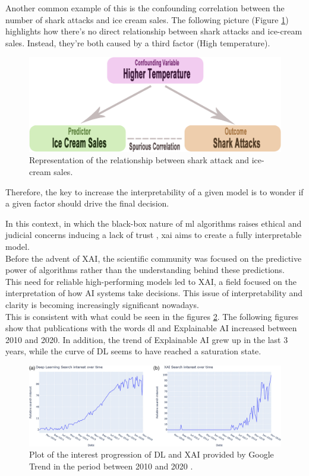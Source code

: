 Another common example of this is the confounding correlation between the number of shark attacks and ice cream sales. 
The following picture (Figure \ref{fig:shark}) \cite{shark-icecream} highlights how there's no direct relationship between shark attacks and ice-cream sales. Instead, they're both caused by a third factor (High temperature).\newline
\begin{figure}[H]
    \centering
    \includegraphics[scale=0.25]{images/confounding.png}
    \caption{Representation of the relationship between shark attack and ice-cream sales.}
    \label{fig:shark}
\end{figure}
Therefore, the key to increase the interpretability of a given model is to wonder if a given factor should drive the final decision.\par
In this context, in which the black-box nature of \acrshort{ml} algorithms raises ethical and judicial concerns inducing a lack of trust \cite{9141213}, \gls{xai} aims to create a fully interpretable model.\\
Before the advent of XAI, the scientific community was focused on the predictive power of algorithms rather than the understanding behind these predictions.\\
This need for reliable high-performing models led to XAI, a field focused on the interpretation of how AI systems take decisions.
This issue of interpretability and clarity is becoming increasingly significant nowadays. \\
This is consistent with what could be seen in the figures \ref{fig:AI_XAI}.
The following figures show that publications with the words \gls{dl} and Explainable AI increased between 2010 and 2020. 
In addition, the trend of Explainable AI grew up in the last 3 years, while the curve of DL seems to have reached a saturation state.\\
\begin{figure}[H]
\centering
    \includegraphics[scale=0.30]{images/DL-XAI.jpg}
    \caption{Plot of the interest progression of DL and XAI provided by Google Trend in the period between 2010 and 2020 \cite{angelov2021explainable}.}
    \label{fig:AI_XAI}
\end{figure}
